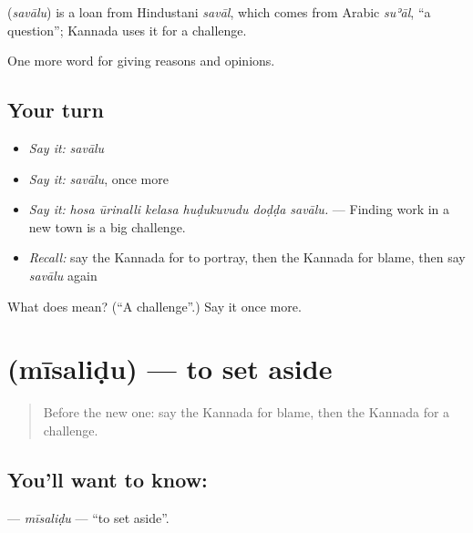 \begin{cousinweb}
\textbf{} (\emph{savālu}) is a loan from Hindustani \emph{savāl}, which comes from Arabic \emph{suʾāl}, \textquotedblleft{}a question\textquotedblright{}; Kannada uses it for a challenge.
\end{cousinweb}

\begin{grammarlens}[title={What you've built}]
One more word for giving reasons and opinions.
\end{grammarlens}

\subsection*{Your turn}
\begin{itemize}
\raggedright
  \item \emph{Say it:} \emph{savālu}
  \item \emph{Say it:} \emph{savālu}, once more
  \item \emph{Say it:} \emph{hosa ūrinalli kelasa huḍukuvudu doḍḍa savālu.} — Finding work in a new town is a big challenge.
  \item \emph{Recall:} say the Kannada for to portray, then the Kannada for blame, then say \emph{savālu} again
\end{itemize}

\begin{tcolorbox}[breakable,colback=teal!4,colframe=teal!35!black,title={Before you move on}]
What does  mean? (\textquotedblleft{}A challenge\textquotedblright{}.) Say it once more.
\end{tcolorbox}
\section[\texorpdfstring{\kn{ಮೀಸಲಿಡು} (mīsaliḍu)}{ಮೀಸಲಿಡು (mīsaliḍu)}]{ (mīsaliḍu) — to set aside}

\label{lesson:KA-C387-misalidu}



\begin{quote}
Before the new one: say the Kannada for blame, then the Kannada for a challenge.
\end{quote}

\subsection*{You'll want to know: }
\textbf{} — \emph{mīsaliḍu} — \textquotedblleft{}to set aside\textquotedblright{}.

